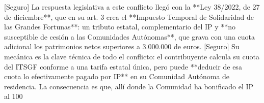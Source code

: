 \documentclass[10pt,a4paper]{article}
\begin{document}
[Seguro] La respuesta legislativa a este conflicto llegó con la **Ley 38/2022, de 27 de diciembre**, que en su art. 3 crea el **Impuesto Temporal de Solidaridad de las Grandes Fortunas**: un tributo estatal, complementario del IP y **no susceptible de cesión a las Comunidades Autónomas**, que grava con una cuota adicional los patrimonios netos superiores a 3.000.000 de euros. [Seguro] Su mecánica es la clave técnica de todo el conflicto: el contribuyente calcula su cuota del ITSGF conforme a una tarifa estatal única, pero puede **deducir de esa cuota lo efectivamente pagado por IP** en su Comunidad Autónoma de residencia. La consecuencia es que, allí donde la Comunidad ha bonificado el IP al 100%
\end{document}
